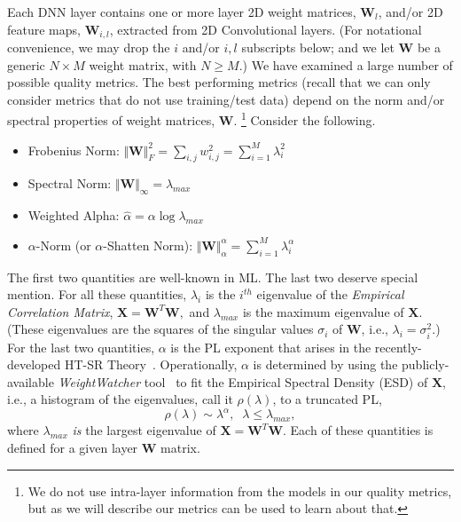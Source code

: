 Each DNN layer contains one or more layer 2D weight matrices, $\mathbf{W}_{l}$, and/or 2D feature maps, $\mathbf{W}_{i,l}$, extracted from 2D Convolutional layers. 
(For notational convenience, we may drop the $i$ and/or $i,l$ subscripts below; and we let $\mathbf{W}$ be a generic $N\times M$ weight matrix, with $N\ge M$.) 
%
We have examined a large number of possible quality metrics.
The best performing metrics (recall that we can only consider metrics that do not use training/test data) depend on the norm and/or spectral properties of weight matrices, $\mathbf{W}$.%
\footnote{We do not use intra-layer information from the models in our quality metrics, but as we will describe our metrics can be used to learn about that.}
Consider the following.
\begin{itemize}
\item 
Frobenius Norm: $\Vert\mathbf{W}\Vert^{2}_{F}=\sum_{i,j}w^{2}_{i,j} = \sum_{i=1}^{M} \lambda_{i}^{2}$
\item 
Spectral Norm: $\Vert\mathbf{W}\Vert_{\infty}=\lambda_{max}$
\item 
Weighted Alpha: $\hat{\alpha}=\alpha\log\lambda_{max}$
\item 
$\alpha$-Norm (or $\alpha$-Shatten Norm): $\Vert\mathbf{W}\Vert^{\alpha}_{\alpha}=\sum_{i=1}^{M}\lambda_{i}^{\alpha}$
\end{itemize}
The first two quantities are well-known in ML.
The last two deserve special mention.
For all these quantities, $\lambda_{i}$ is the $i^{th}$ eigenvalue of the \emph{Empirical Correlation Matrix},
$ %
\mathbf{X}=\mathbf{W}^{T}\mathbf{W} ,
$ %
and $\lambda_{max}$ is the maximum eigenvalue of $\mathbf{X}$. 
(These eigenvalues are the squares of the singular values $\sigma_{i}$ of $\mathbf{W}$, i.e., $\lambda_{i}=\sigma^{2}_{i}$.)
For the last two quantities, $\alpha$ is the PL exponent that arises in the recently-developed HT-SR Theory~\cite{MM18_TR, MM19_HTSR_ICML, MM20_SDM}.
Operationally, $\alpha$ is determined by using the publicly-available \emph{WeightWatcher} tool~\cite{weightwatcher_package} to fit the Empirical Spectral Density (ESD) of $\mathbf{X}$, i.e., a histogram of the eigenvalues, call it $\rho(\lambda)$, to a truncated PL, 
\begin{equation}
\rho(\lambda)\sim\lambda^{\alpha},\;\;\lambda\le\lambda_{max}  ,
\end{equation}
where $\lambda_{max}$ \emph{is} the largest eigenvalue of $\mathbf{X}=\mathbf{W}^{T}\mathbf{W}$.
Each of these quantities is defined for a given layer $\mathbf{W}$ matrix.

